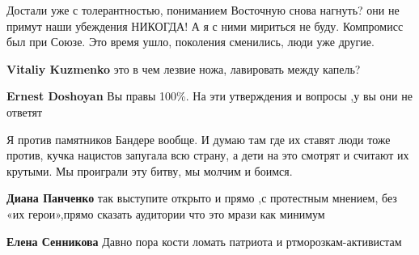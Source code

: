 \begin{itemize}
\begin{itemize}
Достали уже с толерантностью, пониманием
Восточную снова нагнуть? они не примут наши убеждения НИКОГДА! А я с ними
мириться не буду. Компромисс был при Союзе. Это время ушло, поколения
сменились, люди уже другие.

 
\textbf{Vitaliy Kuzmenko} это в чем лезвие ножа, лавировать между капель?

 
\textbf{Ernest Doshoyan} Вы правы 100\%. На эти утверждения и вопросы ,у вы они не ответят

 

Я против памятников Бандере вообще. И думаю там где их ставят люди тоже против,
кучка нацистов запугала всю страну, а дети на это смотрят и считают их крутыми.
Мы проиграли эту битву, мы молчим и боимся.


 
\textbf{Диана Панченко} так выступите открыто и прямо ,с протестным мнением,
без «их герои»,прямо сказать аудитории что это мрази как минимум

 
\textbf{Елена Сенникова} Давно пора кости ломать патриота и ртморозкам-активистам

 


\end{itemize}
\end{itemize}
